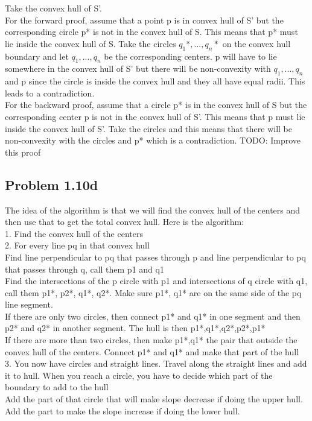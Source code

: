 \documentclass[11pt,psfig]{article}
\begin{document}
Take the convex hull of S'. \\
For the forward proof, assume that a point p is in convex hull of S' but the corresponding circle p* is not in the convex hull of S. This means that p* must lie inside the convex hull of S. Take the circles $q_1*,...,q_n*$ on the convex hull boundary and let $q_1,...,q_n$ be the corresponding centers. p will have to lie somewhere in the convex hull of S' but there will be non-convexity with $q_1,...,q_n$ and p since the circle is inside the convex hull and they all have equal radii. This leads to a contradiction. \\
For the backward proof, assume that a circle p* is in the convex hull of S but the corresponding center p is not in the convex hull of S'. This means that p must lie inside the convex hull of S'. Take the circles and this means that there will be non-convexity with the circles and p* which is a contradiction.
TODO: Improve this proof

\subsection*{Problem 1.10d}

The idea of the algorithm is that we will find the convex hull of the centers and then use that to get the total convex hull. Here is the algorithm:\\
1. Find the convex hull of the centers\\
2. For every line pq in that convex hull\\
			Find line perpendicular to pq that passes through p and line perpendicular to pq that passes through q, call them p1 and q1\\
			Find the intersections of the p circle with p1 and intersections of q circle with q1, call them p1*, p2*, q1*, q2*. Make sure p1*, q1* are on the same side of the pq line segment. \\
			If there are only two circles, then connect p1* and q1* in one segment and then p2* and q2* in another segment. The hull is then p1*,q1*,q2*,p2*,p1*\\
			If there are more than two circles, then make p1*,q1* the pair that outside the convex hull of the centers. Connect p1* and q1* and make that part of the hull\\
3. You now have circles and straight lines. Travel along the straight lines and add it to hull. When you reach a circle, you have to decide which part of the boundary to add to the hull\\
			Add the part of that circle that will make slope decrease if doing the upper hull.\\
			Add the part to make the slope increase if doing the lower hull.
\end{document}
